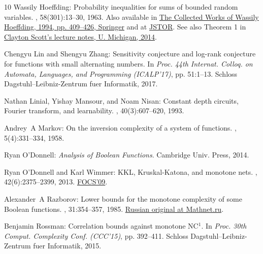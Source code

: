 \documentclass[11pt]{article}
\numberwithin{equation}{section}
\theoremstyle{definition}
\theoremstyle{plain}
\begin{document}
\begin{thebibliography}{10}
{\sc Wassily Hoeffding}: Probability inequalities for sums of bounded random
  variables.
, 58(301):13--30, 1963.
\newblock Also available in
  \href{https://doi.org/10.1007/978-1-4612-0865-5\_26}{The Collected Works of
  Wassily Hoeffding, 1994, pp. 409--426, Springer} and at
  \href{https://doi.org/10.2307/2282952}{JSTOR}. See also Theorem 1 in
  \href{https://web.eecs.umich.edu/~cscott/past\_courses/eecs598w14/notes/03\_hoeffding.pdf}{Clayton
  Scott's lecture notes, U. Michigan, 2014}.
\newblock [\epfmtdoi{10.1080/01621459.1963.10500830}]

{\sc Chengyu Lin and Shengyu Zhang}: Sensitivity conjecture and log-rank
  conjecture for functions with small alternating numbers.
\newblock In {\em Proc. 44th Internat. Colloq. on Automata, Languages, and
  Programming (ICALP'17)}, pp. 51:1--13. Schloss Dagstuhl--Leibniz-Zentrum fuer
  Informatik, 2017.

{\sc Nathan Linial, Yishay Mansour, and Noam Nisan}: Constant depth circuits,
  {F}ourier transform, and learnability.
, 40(3):607--620, 1993.
\newblock [\epfmtdoi{10.1145/174130.174138}]

{\sc Andrey~A Markov}: On the inversion complexity of a system of functions.
, 5(4):331--334, 1958.
\newblock [\epfmtdoi{10.1145/320941.320945}]

{\sc Ryan O'Donnell}: {\em Analysis of {B}oolean Functions}.
\newblock Cambridge Univ. Press, 2014.

{\sc Ryan O'Donnell and Karl Wimmer}: {KKL, Kruskal-Katona, and monotone nets}.
, 42(6):2375--2399, 2013.
\newblock \prelim \href{https://doi.org/10.1109/FOCS.2009.78}{FOCS'09}.
\newblock [\epfmtdoi{10.1137/100787325}]

{\sc Alexander~A Razborov}: Lower bounds for the monotone complexity of some
  {B}oolean functions.
, 31:354--357, 1985.
\newblock
  \href{https://www.mathnet.ru/links/c9ed090b71ff8f206b8e1a08ccc6cea4/dan9192.pdf}{Russian
  original at Mathnet.ru}.

{\sc Benjamin Rossman}: Correlation bounds against monotone {NC$^1$}.
\newblock In {\em Proc. 30th Comput. Complexity Conf. (CCC'15)}, pp. 392--411.
  Schloss Dagstuhl--Leibniz-Zentrum fuer Informatik, 2015.


\end{thebibliography}
\end{document}

